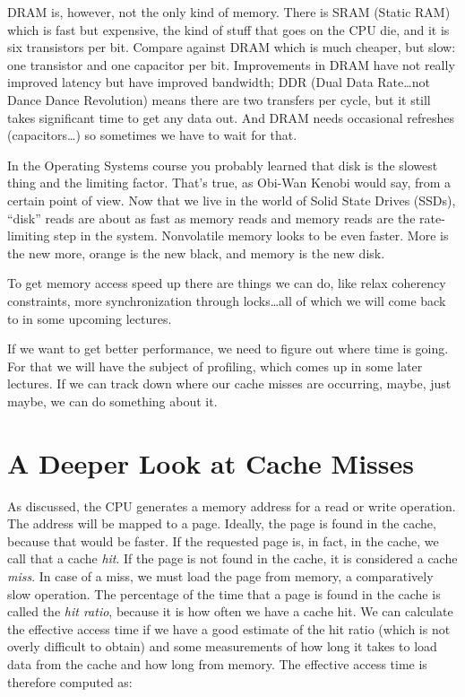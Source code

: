 \documentclass[a4paper]{report}
\begin{document}
DRAM is, however, not the only kind of memory. There is SRAM (Static RAM) which is fast but expensive, the kind of stuff that goes on the CPU die, and it is six transistors per bit. Compare against DRAM which is much cheaper, but slow: one transistor and one capacitor per bit. Improvements in DRAM have not really improved latency but have improved bandwidth; DDR (Dual Data Rate\ldots not Dance Dance Revolution) means there are two transfers per cycle, but it still takes significant time to get any data out. And DRAM needs occasional refreshes (capacitors\ldots) so sometimes we have to wait for that.

In the Operating Systems course you probably learned that disk is the slowest thing and the limiting factor. That's true, as Obi-Wan Kenobi would say, from a certain point of view. Now that we live in the world of Solid State Drives (SSDs), ``disk'' reads are about as fast as memory reads and memory reads are the rate-limiting step in the system. Nonvolatile memory looks to be even faster. More is the new more, orange is the new black, and memory is the new disk.

To get memory access speed up there are things we can do, like relax coherency constraints, more synchronization through locks\ldots all of which we will come back to in some upcoming lectures. 

If we want to get better performance, we need to figure out where time is going. For that we will have the subject of profiling, which comes up in some later lectures. If we can track down where our cache misses are occurring, maybe, just maybe, we can do something about it. 

\section*{A Deeper Look at Cache Misses}

As discussed, the CPU generates a memory address for a read or write operation. The address will be mapped to a page. Ideally, the page is found in the cache, because that would be faster. If the requested page is, in fact,  in the cache, we call that a cache \textit{hit}. If the page is not found in the cache, it is considered a cache \textit{miss}. In case of a miss, we must load the page from memory, a comparatively slow operation. The percentage of the time that a page is found in the cache is called the \textit{hit ratio}, because it is how often we have a cache hit. We can calculate the effective access time if we have a good estimate of the hit ratio (which is not overly difficult to obtain) and some measurements of how long it takes to load data from the cache and how long from memory. The effective access time is therefore computed as:
\end{document}
